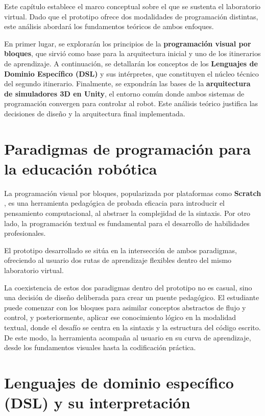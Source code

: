 
Este capítulo establece el marco conceptual sobre el que se sustenta el laboratorio virtual. Dado que el prototipo ofrece dos modalidades de programación distintas, este análisis abordará los fundamentos teóricos de ambos enfoques. 

En primer lugar, se explorarán los principios de la \textbf{programación visual por bloques}, que sirvió como base para la arquitectura inicial y uno de los itinerarios de aprendizaje. A continuación, se detallarán los conceptos de los \textbf{Lenguajes de Dominio Específico (DSL)} y sus intérpretes, que constituyen el núcleo técnico del segundo itinerario. Finalmente, se expondrán las bases de la \textbf{arquitectura de simuladores 3D en Unity}, el entorno común donde ambos sistemas de programación convergen para controlar al robot. Este análisis teórico justifica las decisiones de diseño y la arquitectura final implementada.

\section{Paradigmas de programación  para la educación robótica}



La programación visual por bloques, popularizada por plataformas como \textbf{Scratch} \cite{Paredes2023}, es una herramienta pedagógica de probada eficacia para introducir el pensamiento computacional, al abstraer la complejidad de la sintaxis. Por otro lado, la programación textual es fundamental para el desarrollo de habilidades profesionales.

El prototipo desarrollado se sitúa en la intersección de ambos paradigmas,  ofreciendo al usuario dos rutas de aprendizaje flexibles dentro del mismo laboratorio virtual.

La coexistencia de estos dos paradigmas dentro del prototipo no es casual, sino una decisión de diseño deliberada para crear un puente pedagógico. El estudiante puede comenzar con los bloques para asimilar conceptos abstractos de flujo y control, y posteriormente, aplicar ese conocimiento lógico en la modalidad textual, donde el desafío se centra en la sintaxis y la estructura del código escrito. De este modo, la herramienta acompaña al usuario en su curva de aprendizaje, desde los fundamentos visuales hasta la codificación práctica.


\section{Lenguajes de dominio específico (DSL) y su interpretación}


